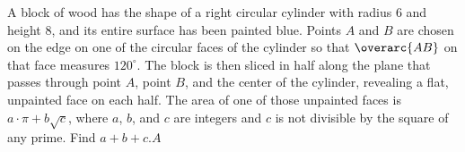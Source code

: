 A block of wood has the shape of a right circular cylinder with radius $6$ and height $8$,  and its entire surface has been painted blue. Points $A$ and $B$ are chosen on the edge on one of the circular faces of the cylinder so that $\overarc{AB}$ on that face measures $120^\circ$. The block is then sliced in half along the plane that passes through point $A$,  point $B$,  and the center of the cylinder, revealing a flat, unpainted face on each half. The area of one of those unpainted faces is $a\cdot\pi + b\sqrt{c}$,  where $a$,  $b$,  and $c$ are integers and $c$ is not divisible by the square of any prime. Find $a+b+c$.$A$